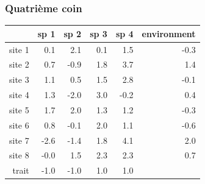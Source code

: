 \documentclass{beamer}
\numberwithin{exercise}{section}
\begin{document}
\begin{frame}
\frametitle{Quatri\`{e}me coin}
\small
\begin{table}[ht]
\begin{center}
\begin{tabular}{r|rrrr|r|}
  & sp 1 & sp 2 & sp 3 & sp 4 & environment \\ 
  \hline
site 1 & 0.1 & 2.1 & 0.1 & 1.5 & -0.3 \\ 
  site 2 & 0.7 & -0.9 & 1.8 & 3.7 & 1.4 \\ 
  site 3 & 1.1 & 0.5 & 1.5 & 2.8 & -0.1 \\ 
  site 4 & 1.3 & -2.0 & 3.0 & -0.2 & 0.4 \\ 
  site 5 & 1.7 & 2.0 & 1.3 & 1.2 & -0.3 \\ 
  site 6 & 0.8 & -0.1 & 2.0 & 1.1 & -0.6 \\ 
  site 7 & -2.6 & -1.4 & 1.8 & 4.1 & 2.0 \\ 
  site 8 & -0.0 & 1.5 & 2.3 & 2.3 & 0.7 \\ 
   \hline
  trait & -1.0 & -1.0 & 1.0 & 1.0 &  \\ 
   \hline
\end{tabular}
\end{center}
\end{table}\normalsize 
\end{frame}
\end{document}
